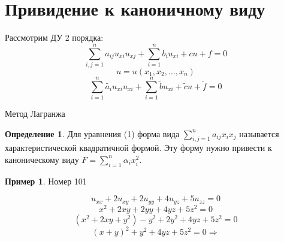\documentclass[a4paper, 12pt]{article}
\theoremstyle{definition}
\newtheorem*{definition}{Определение}
\newtheorem*{example}{Пример}
\begin{document}
\section*{Привидение к каноничному виду}

    Рассмотрим ДУ 2 порядка:
    $$ \sum_{i, j = 1}^{n} a_{ij} u_{xi} u_{xj} + \sum_{i = 1}^{n} b_i u_{xi} + cu + f = 0 $$
    $$ u = u(x_1, x_2, \ldots, x_n) $$
    $$ \sum_{i = 1}^{n} \tilde{a_i} u_{xi} u_{xi} + \sum_{i = 1}^{n} \tilde{b} u_{xi} + \tilde{c} u + \tilde{f} = 0 $$
    
    Метод Лагранжа
    \begin{definition}
        Для уравнения (1) форма вида $ \sum_{i, j = 1}^{n} a_{ij} x_i x_j $ называется характеристической квадратичной формой. Эту форму нужно привести к каноническому виду $ F = \sum_{i = 1}^{n} \alpha_i x_i^2 $.
    \end{definition}    

    \begin{example}
        Номер 101 \par
        $$ u_{xx} + 2u_{xy} + 2u_{yy} + 4u_{yz} + 5u_{zz} = 0 $$
        $$ x^2 + 2xy + 2yy + 4yz + 5z^2 = 0 $$
        $$ (x^2 + 2xy + y^2) - y^2 + 2y^2 + 4yz + 5z^2 = 0 $$
        $$ (x + y)^2 + y^2 + 4yz + 5z^2 = 0 \Rightarrow  $$
    \end{example} \pagebreak
    
\end{document}
